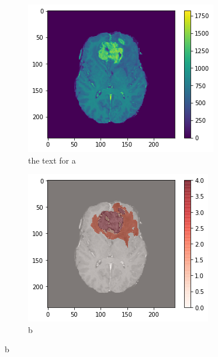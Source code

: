 \begin{figure}[H]
    \centering
    \begin{subfigure}{.33\textwidth}
        \centering
        \includegraphics[width=\linewidth]{chapters/07_brats3d/images/02_t1ce.png}
        \caption{ the text for a}
    \end{subfigure}%
    \begin{subfigure}{.33\textwidth}
        \centering
        \includegraphics[width=\linewidth]{chapters/07_brats3d/images/06_t1ce_segment.png}
        \caption{b}
    \end{subfigure}

\end{figure}
